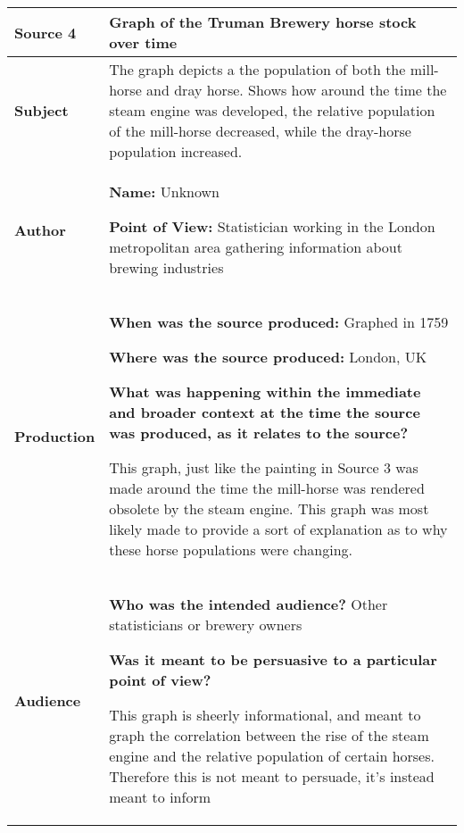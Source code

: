 {\renewcommand{\arraystretch}{2}
\begin{longtable}{ | p{3cm} | p{13cm} | }
\hline

\textbf{Source 4} &
Graph of the Truman Brewery horse stock over time
\\\hline

\textbf{Subject} &
The graph depicts a the population of both the mill-horse and dray horse.  Shows how around the time the steam engine was developed, the relative population of the mill-horse decreased, while the dray-horse population increased.
\\\hline

\textbf{Author} &
\textbf{Name:} Unknown \n

\textbf{Point of View:} Statistician  working in the London metropolitan area gathering information about brewing industries
\\\hline

\textbf{Production} &
\textbf{When was the source produced:} Graphed in 1759

\textbf{Where was the source produced:} London, UK \n

\textbf{What was happening within the immediate and broader context at the time the source was produced, as it relates to the source? } \n

This graph, just like the painting in Source 3 was made around the time the mill-horse was rendered obsolete by the steam engine.  This graph was most likely made to provide a sort of explanation as to why these horse populations were changing.
\\\hline

\textbf{Audience} &
\textbf{Who was the intended audience?} Other statisticians or brewery owners \n 

\textbf{Was it meant to be persuasive to a particular point of view? } \n

This graph is sheerly informational, and meant to graph the correlation between the rise of the steam engine and the relative population of certain horses.  Therefore this is not meant to persuade, it's instead meant to inform
\\\hline
\end{longtable}}